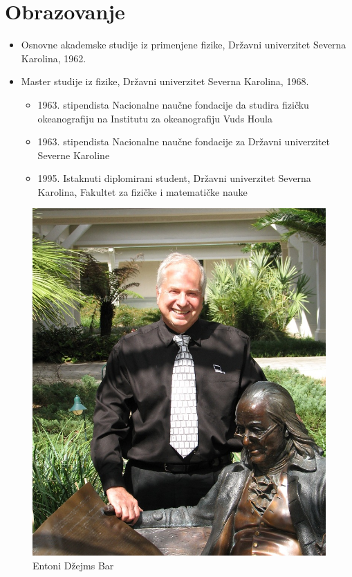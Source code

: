 \documentclass[a4paper]{article}
\begin{document}
{		\newpage

		\section{Obrazovanje}
		
		\begin{itemize}
			\item Osnovne akademske studije iz primenjene fizike, Državni univerzitet Severna Karolina, 1962.
			\item Master studije iz fizike, Državni univerzitet Severna Karolina, 1968.
			\begin{itemize}
				\item 1963. stipendista Nacionalne naučne fondacije da studira fizičku okeanografiju na Institutu za okeanografiju Vuds Houla
				\item 1963. stipendista Nacionalne naučne fondacije za Državni univerzitet Severne Karoline
				\item 1995. Istaknuti diplomirani student, Državni univerzitet Severna Karolina, Fakultet za fizičke i matematičke nauke
			\end{itemize}
		\end{itemize}
		
		
		\begin{figure}[h!]
			\begin{center}
				\includegraphics[scale=0.7]{TonyBarr.jpg}
			\end{center}
			\caption{Entoni Džejms Bar}
		\end{figure}
		
}
\end{document}
